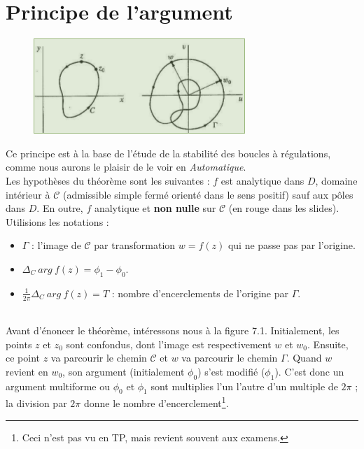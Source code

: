 \section{Principe de l'argument}
\begin{figure}
	\includegraphics[scale=0.4]{ch7/image1.png}
\end{figure}
Ce principe est à la base de l'étude de la stabilité des boucles à régulations, comme 
nous aurons le plaisir de le voir en \textit{Automatique}.\\
Les hypothèses du théorème sont les suivantes : $f$ est analytique dans $D$, domaine
intérieur à $\mathcal{C}$ (admissible simple fermé orienté dans le sens positif) sauf 
aux pôles dans $D$. En outre, $f$ analytique et \textbf{non nulle} sur $\mathcal{C}$
(en rouge dans les slides).\\
Utilisions les notations  :\ \\
\begin{itemize}
	\item $\Gamma$ : l'image de $\mathcal{C}$ par transformation $w=f(z)$ qui ne passe pas
	      par l'origine.
	\item $\Delta_C\ arg\ f(z) = \phi_1-\phi_0$.
	\item $\frac{1}{2\pi}\Delta_C\ arg\ f(z) = T$ : nombre d'encerclements de l'origine par
	      $\Gamma$.
\end{itemize}\ \\
Avant d'énoncer le théorème, intéressons nous à la figure 7.1. Initialement, les points
$z$ et $z_0$ sont confondus, dont l'image est respectivement $w$ et $w_0$. Ensuite, 
ce point $z$ va parcourir le chemin $\mathcal{C}$ et $w$ va parcourir le chemin $\Gamma$. 
Quand $w$ revient en $w_0$, son argument (initialement $\phi_0$) s'est modifié ($\phi_1$). 
C'est donc un argument multiforme ou $\phi_0$ et $\phi_1$ sont multiplies l'un l'autre 
d'un multiple de $2\pi$ ; la division par $2\pi$ donne le nombre  d'encerclement\footnote{
	Ceci n'est pas vu en TP, mais revient souvent aux examens.}.\\

